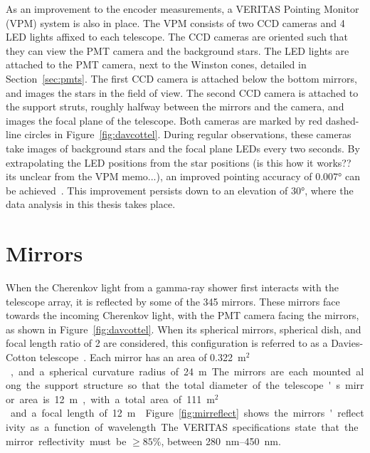 As an improvement to the encoder measurements, a VERITAS Pointing Monitor (VPM) system is also in place.
The VPM consists of two CCD cameras and 4 LED lights affixed to each telescope.
The CCD cameras are oriented such that they can view the PMT camera and the background stars.
The LED lights are attached to the PMT camera, next to the Winston cones, detailed in Section~\ref{sec:pmts}.
The first CCD camera is attached below the bottom mirrors, and images the stars in the field of view.
The second CCD camera is attached to the support struts, roughly halfway between the mirrors and the camera, and images the focal plane of the telescope.
Both cameras are marked by red dashed-line circles in Figure~\ref{fig:davcottel}.
During regular observations, these cameras take images of background stars and the focal plane LEDs every two seconds.
By extrapolating the LED positions from the star positions {\color{red}(is this how it works?? its unclear from the VPM memo...)}, an improved pointing accuracy of \nicetilde{}\ang{0.007} can be achieved~\cite{VPMmemo}.
%
This improvement persists down to an elevation of \ang{30}, where the data analysis in this thesis takes place.

\section{Mirrors}\label{sec:mirrors}

When the Cherenkov light from a gamma-ray shower first interacts with the telescope array, it is reflected by some of the 345 mirrors.
These mirrors face towards the incoming Cherenkov light, with the PMT camera facing the mirrors, as shown in Figure~\ref{fig:davcottel}.
When its spherical mirrors, spherical dish, and focal length ratio of \nicetilde{}2 are considered, this configuration is referred to as a Davies-Cotton telescope~\cite{daviescotton}.
Each mirror has an area of \SI{0.322}{m$^2$}, and a spherical curvature radius of \SI{24}{m}.
The mirrors are each mounted along the support structure so that the total diameter of the telescope's mirror area is \SI{12}{m}, with a total area of \SI{111}{m$^2$} and a focal length of \SI{12}{m}~\cite{Veritas_Detector}.
Figure~\ref{fig:mirreflect} shows the mirrors' reflectivity as a function of wavelength.
The VERITAS specifications state that the mirror reflectivity must be $\geq 85\%$, between \SIrange{280}{450}{nm}.

